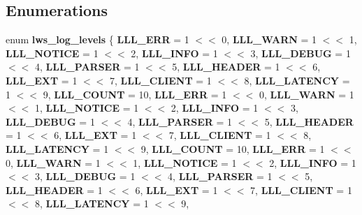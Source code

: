 \subsection*{Enumerations}
\begin{DoxyCompactItemize}
\item 
\mbox{\label{group__log_ga14542b84d2c76efa7814124bb10f9c5f}} 
enum {\bfseries lws\+\_\+log\+\_\+levels} \{ \newline
{\bfseries L\+L\+L\+\_\+\+E\+RR} = 1 $<$$<$ 0, 
{\bfseries L\+L\+L\+\_\+\+W\+A\+RN} = 1 $<$$<$ 1, 
{\bfseries L\+L\+L\+\_\+\+N\+O\+T\+I\+CE} = 1 $<$$<$ 2, 
{\bfseries L\+L\+L\+\_\+\+I\+N\+FO} = 1 $<$$<$ 3, 
\newline
{\bfseries L\+L\+L\+\_\+\+D\+E\+B\+UG} = 1 $<$$<$ 4, 
{\bfseries L\+L\+L\+\_\+\+P\+A\+R\+S\+ER} = 1 $<$$<$ 5, 
{\bfseries L\+L\+L\+\_\+\+H\+E\+A\+D\+ER} = 1 $<$$<$ 6, 
{\bfseries L\+L\+L\+\_\+\+E\+XT} = 1 $<$$<$ 7, 
\newline
{\bfseries L\+L\+L\+\_\+\+C\+L\+I\+E\+NT} = 1 $<$$<$ 8, 
{\bfseries L\+L\+L\+\_\+\+L\+A\+T\+E\+N\+CY} = 1 $<$$<$ 9, 
{\bfseries L\+L\+L\+\_\+\+C\+O\+U\+NT} = 10, 
{\bfseries L\+L\+L\+\_\+\+E\+RR} = 1 $<$$<$ 0, 
\newline
{\bfseries L\+L\+L\+\_\+\+W\+A\+RN} = 1 $<$$<$ 1, 
{\bfseries L\+L\+L\+\_\+\+N\+O\+T\+I\+CE} = 1 $<$$<$ 2, 
{\bfseries L\+L\+L\+\_\+\+I\+N\+FO} = 1 $<$$<$ 3, 
{\bfseries L\+L\+L\+\_\+\+D\+E\+B\+UG} = 1 $<$$<$ 4, 
\newline
{\bfseries L\+L\+L\+\_\+\+P\+A\+R\+S\+ER} = 1 $<$$<$ 5, 
{\bfseries L\+L\+L\+\_\+\+H\+E\+A\+D\+ER} = 1 $<$$<$ 6, 
{\bfseries L\+L\+L\+\_\+\+E\+XT} = 1 $<$$<$ 7, 
{\bfseries L\+L\+L\+\_\+\+C\+L\+I\+E\+NT} = 1 $<$$<$ 8, 
\newline
{\bfseries L\+L\+L\+\_\+\+L\+A\+T\+E\+N\+CY} = 1 $<$$<$ 9, 
{\bfseries L\+L\+L\+\_\+\+C\+O\+U\+NT} = 10, 
{\bfseries L\+L\+L\+\_\+\+E\+RR} = 1 $<$$<$ 0, 
{\bfseries L\+L\+L\+\_\+\+W\+A\+RN} = 1 $<$$<$ 1, 
\newline
{\bfseries L\+L\+L\+\_\+\+N\+O\+T\+I\+CE} = 1 $<$$<$ 2, 
{\bfseries L\+L\+L\+\_\+\+I\+N\+FO} = 1 $<$$<$ 3, 
{\bfseries L\+L\+L\+\_\+\+D\+E\+B\+UG} = 1 $<$$<$ 4, 
{\bfseries L\+L\+L\+\_\+\+P\+A\+R\+S\+ER} = 1 $<$$<$ 5, 
\newline
{\bfseries L\+L\+L\+\_\+\+H\+E\+A\+D\+ER} = 1 $<$$<$ 6, 
{\bfseries L\+L\+L\+\_\+\+E\+XT} = 1 $<$$<$ 7, 
{\bfseries L\+L\+L\+\_\+\+C\+L\+I\+E\+NT} = 1 $<$$<$ 8, 
{\bfseries L\+L\+L\+\_\+\+L\+A\+T\+E\+N\+CY} = 1 $<$$<$ 9, 
\newline

\end{DoxyCompactItemize}
